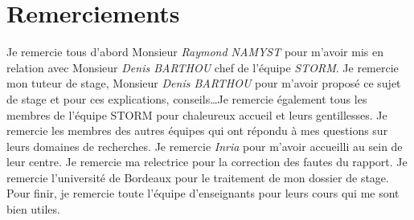 \section{Remerciements}

Je remercie tous d'abord Monsieur \emph{Raymond NAMYST} pour m'avoir mis en relation avec
Monsieur \emph{Denis BARTHOU} chef de l'équipe \emph{STORM}. Je remercie mon tuteur de
stage, Monsieur \emph{Denis BARTHOU} pour m'avoir proposé ce sujet de stage et pour ces
explications, conseils\dots\space Je remercie également tous les membres de l'équipe
STORM pour chaleureux accueil et leurs gentillesses. Je remercie les membres des autres
équipes qui ont répondu à mes questions sur leurs domaines de recherches. Je remercie
\emph{Inria} pour m'avoir accueilli au sein de leur centre. Je remercie ma relectrice
pour la correction des fautes du rapport. Je remercie l'université de Bordeaux pour le
traitement de mon dossier de stage. Pour finir, je remercie toute l'équipe d'enseignants
pour leurs cours qui me sont bien utiles.
